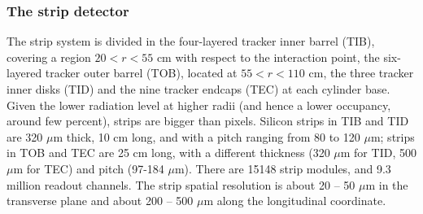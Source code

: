 \subsubsection{The strip detector}
The strip system is divided in the four-layered tracker inner barrel (TIB), covering a region $20 < r < 55$ cm with respect to the interaction point, the six-layered tracker outer barrel (TOB), located at $55 < r < 110$ cm, the three tracker inner disks (TID) and the nine tracker endcaps (TEC) at each cylinder base. Given the lower radiation level at higher radii (and hence a lower occupancy, around few percent), strips are bigger than pixels. Silicon strips in TIB and TID are 320 $\mu$m thick, 10 cm long, and with a pitch ranging from 80 to 120 $\mu$m; strips in TOB and TEC are 25 cm long, with a different thickness (320 $\mu$m for TID, 500 $\mu$m for TEC) and pitch (97-184 $\mu$m). There are 15148 strip modules, and 9.3 million readout channels. The strip spatial resolution is about 20 -- 50 $\mu$m in the transverse plane and about 200 -- 500 $\mu$m along the longitudinal coordinate.

